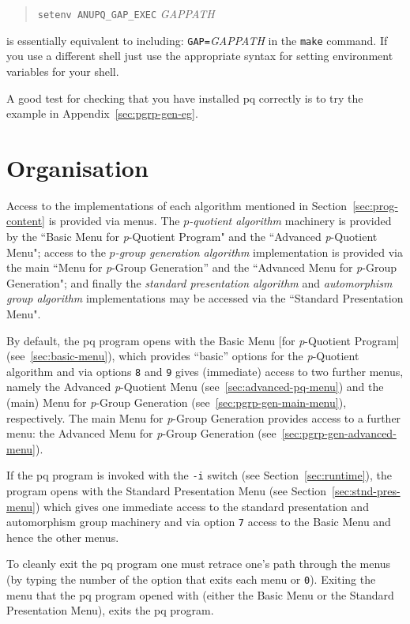 \documentclass[12pt]{article}
\begin{document}
\begin{quote}
\verb|setenv ANUPQ_GAP_EXEC| \textit{GAPPATH}
\end{quote}
%
is essentially equivalent to including: \verb|GAP=|\textit{GAPPATH}
in the \verb|make| command. If you use a different shell just use the
appropriate syntax for setting environment variables for your shell.

A good test for checking that you have installed pq correctly is to try
the example in Appendix~\ref{sec:pgrp-gen-eg}.

\section{Organisation}
Access to the implementations of each algorithm mentioned in
Section~\ref{sec:prog-content} is provided via menus. 
The \emph{$p$-quotient algorithm} machinery is provided by the
``Basic Menu for {\it p}-Quotient Program" and
the ``Advanced {\it p}-Quotient Menu";
access to the \emph{$p$-group generation algorithm} implementation is
provided via the main ``Menu for {\it p}-Group Generation'' and the
``Advanced Menu for {\it p}-Group Generation"; and finally the
\emph{standard presentation algorithm} and \emph{automorphism group algorithm}
implementations may be accessed via the ``Standard Presentation Menu".

By default, the pq program opens with the Basic Menu [for {\it p}-Quotient
Program] (see~\ref{sec:basic-menu}), which provides ``basic'' options for
the {\it p}-Quotient algorithm and via options \texttt{8} and \texttt{9}
gives (immediate) access to two further menus, 
namely the Advanced {\it p}-Quotient Menu 
(see~\ref{sec:advanced-pq-menu}) and the (main) 
Menu for {\it p}-Group Generation (see~\ref{sec:pgrp-gen-main-menu}),
respectively. The main Menu for {\it p}-Group Generation provides
access to a further menu: the Advanced Menu for {\it p}-Group Generation 
(see~\ref{sec:pgrp-gen-advanced-menu}).

If the pq program is invoked with the \texttt{-i} switch (see
Section~\ref{sec:runtime}), the program opens with the 
Standard Presentation Menu (see Section~\ref{sec:stnd-pres-menu}) 
which gives one immediate access to the 
standard presentation and automorphism group machinery
and via option \texttt{7} access to the Basic Menu
and hence the other menus.

To cleanly exit the pq program one must retrace one's path through the menus
(by typing the number of the option that exits each menu or \texttt{0}).
Exiting the menu that the pq program opened with (either the Basic Menu
or the Standard Presentation Menu), exits the pq program.
\end{document}
